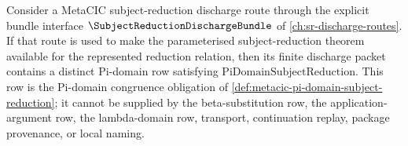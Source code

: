 \begin{proposition}\label{prop:metacic-pi-domain-setup-row-mandatory}
Consider a MetaCIC subject-reduction discharge route through the explicit bundle interface $\SubjectReductionDischargeBundle$ of \autoref{ch:sr-discharge-routes}. If that route is used to make the parameterised subject-reduction theorem available for the represented reduction relation, then its finite discharge packet contains a distinct Pi-domain row satisfying $\mathrm{PiDomainSubjectReduction}$. This row is the Pi-domain congruence obligation of \autoref{def:metacic-pi-domain-subject-reduction}; it cannot be supplied by the beta-substitution row, the application-argument row, the lambda-domain row, transport, continuation replay, package provenance, or local naming.
\end{proposition}
